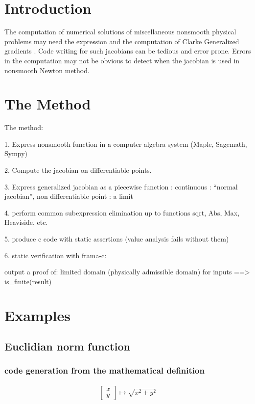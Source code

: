 \documentclass[a4paper]{article}
\begin{document}
\makeRT

\newpage
\tableofcontents
\newpage

\section{Introduction}
The computation of numerical solutions of miscellaneous nonsmooth physical
problems may need the expression and the computation of Clarke Generalized
gradients \cite{Clarke1975}.  Code writing for such jacobians can be tedious
and error prone. Errors in the computation may not be obvious to detect when
the jacobian is used in nonsmooth Newton method.


\section{The Method}


The method:

1. Express nonsmooth function in a computer algebra system (Maple, Sagemath, Sympy)

2. Compute the jacobian on differentiable points.

3. Express generalized jacobian as a piecewise function : continuous : ``normal jacobian'',  non differentiable point : a limit

4. perform common subexpression elimination up to functions sqrt, Abs, Max, Heaviside, etc.

5. produce c code with static assertions (value analysis fails without them)

6. static verification with frama-c:

output a proof of: limited domain (physically admissible domain) for inputs ==> is\_finite(result)

\section{Examples}

\subsection{Euclidian norm function}

\subsubsection{code generation from the mathematical definition}
\begin{equation}
  \begin{array}{ll}
  \left [\begin{array}{c}
    x\\
    y
    \end{array} \right] \mapsto \sqrt{x^2+y^2}
  \end{array}
\end{equation}
\end{document}
